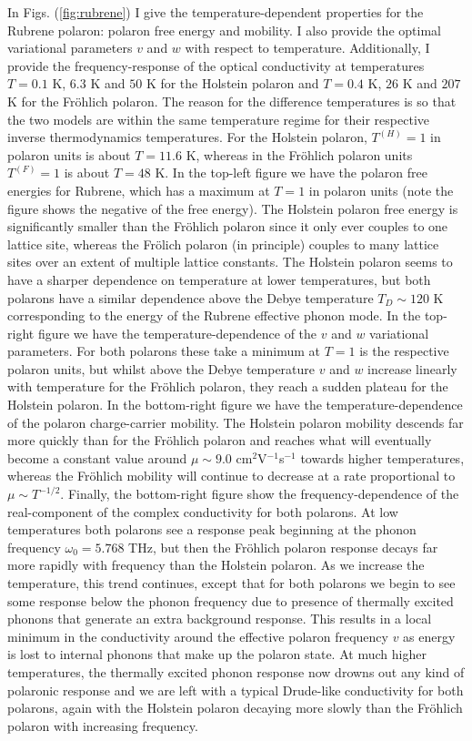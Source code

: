 In Figs. (\ref{fig:rubrene}) I give the temperature-dependent properties for the Rubrene polaron: polaron free energy and mobility. I also provide the optimal variational parameters $v$ and $w$ with respect to temperature.  Additionally, I provide the frequency-response of the optical conductivity at temperatures $T = 0.1$ K, $6.3$ K and $50$ K for the Holstein polaron and $T = 0.4$ K, $26$ K and $207$ K for the Fr\"ohlich polaron. The reason for the difference temperatures is so that the two models are within the same temperature regime for their respective inverse thermodynamics temperatures. For the Holstein polaron, $T^{(H)} = 1$ in polaron units is about $T = 11.6$ K, whereas in the Fr\"ohlich polaron units $T^{(F)} = 1$ is about $T = 48$ K. In the top-left figure we have the polaron free energies for Rubrene, which has a maximum at $T = 1$ in polaron units (note the figure shows the negative of the free energy). The Holstein polaron free energy is significantly smaller than the Fr\"ohlich polaron since it only ever couples to one lattice site, whereas the Fr\"olich polaron (in principle) couples to many lattice sites over an extent of multiple lattice constants. The Holstein polaron seems to have a sharper dependence on temperature at lower temperatures, but both polarons have a similar dependence above the Debye temperature $T_D \sim 120$ K corresponding to the energy of the Rubrene effective phonon mode. In the top-right figure we have the temperature-dependence of the $v$ and $w$ variational parameters. For both polarons these take a minimum at $T=1$ is the respective polaron units, but whilst above the Debye temperature $v$ and $w$ increase linearly with temperature for the Fr\"ohlich polaron, they reach a sudden plateau for the Holstein polaron. In the bottom-right figure we have the temperature-dependence of the polaron charge-carrier mobility. The Holstein polaron mobility descends far more quickly than for the Fr\"ohlich polaron and reaches what will eventually become a constant value around $\mu \sim 9.0$ cm$^2$V$^{-1}$s$^{-1}$ towards higher temperatures, whereas the Fr\"ohlich mobility will continue to decrease at a rate proportional to $\mu \sim T^{-1/2}$. Finally, the bottom-right figure show the frequency-dependence of the real-component of the complex conductivity for both polarons. At low temperatures both polarons see a response peak beginning at the phonon frequency $\omega_0 = 5.768$ THz, but then the Fr\"ohlich polaron response decays far more rapidly with frequency than the Holstein polaron. As we increase the temperature, this trend continues, except that for both polarons we begin to see some response below the phonon frequency due to presence of thermally excited phonons that generate an extra background response. This results in a local minimum in the conductivity around the effective polaron frequency $v$ as energy is lost to internal phonons that make up the polaron state. At much higher temperatures, the thermally excited phonon response now drowns out any kind of polaronic response and we are left with a typical Drude-like conductivity for both polarons, again with the Holstein polaron decaying more slowly than the Fr\"ohlich polaron with increasing frequency.

